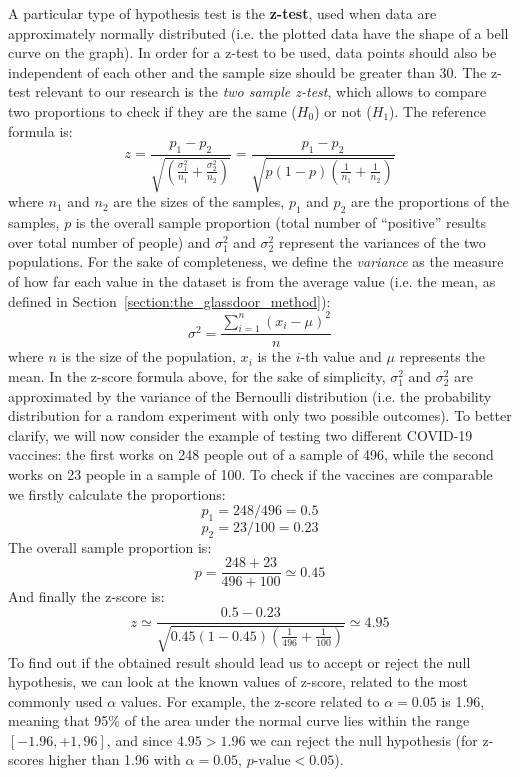 A particular type of hypothesis test is the \textbf{z-test}, used when data are approximately normally distributed (i.e. the plotted data have the shape of a bell curve on the graph). In order for a z-test to be used, data points should also be independent of each other and the sample size should be greater than 30. The z-test relevant to our research is the \textit{two sample z-test}, which allows to compare two proportions to check if they are the same (\(H_0\)) or not (\(H_1\)). The reference formula is: \[z = \frac{p_1 - p_2}{\sqrt{(\frac{\sigma_1^2}{n_1} + \frac{\sigma_2^2}{n_2})}} = \frac{p_1 - p_2}{\sqrt{p(1 - p)(\frac{1}{n_1} + \frac{1}{n_2})}}\] where \(n_1\) and \(n_2\) are the sizes of the samples, \(p_1\) and \(p_2\) are the proportions of the samples, \(p\) is the overall sample proportion (total number of ``positive'' results over total number of people) and \(\sigma_1^2\) and \(\sigma_2^2\) represent the variances of the two populations. For the sake of completeness, we define the \textit{variance} as the measure of how far each value in the dataset is from the average value (i.e. the mean, as defined in Section~\ref{section:the_glassdoor_method}): \[\sigma^2 = \frac{\sum\limits_{i=1}^n (x_i - \mu)^2}{n}\] where \(n\) is the size of the population, \(x_i\) is the \(i\)-th value and \(\mu\) represents the mean. In the z-score formula above, for the sake of simplicity, \(\sigma_1^2\) and \(\sigma_2^2\) are approximated by the variance of the Bernoulli distribution (i.e. the probability distribution for a random experiment with only two possible outcomes). To better clarify, we will now consider the example of testing two different COVID-19 vaccines: the first works on 248 people out of a sample of 496, while the second works on 23 people in a sample of 100. To check if the vaccines are comparable we firstly calculate the proportions: \[p_1 = 248 / 496 = 0.5\] \[p_2 = 23 / 100 = 0.23\]
The overall sample proportion is: \[p = \frac{248 + 23}{496 + 100} \simeq 0.45\]
And finally the z-score is: \[z \simeq \frac{0.5 - 0.23}{\sqrt{0.45(1 - 0.45)(\frac{1}{496} + \frac{1}{100})}} \simeq 4.95\]
To find out if the obtained result should lead us to accept or reject the null hypothesis, we can look at the known values of z-score, related to the most commonly used \(\alpha\) values. For example, the z-score related to \(\alpha = 0.05\) is 1.96, meaning that 95\% of the area under the normal curve lies within the range \([-1.96, +1,96]\), and since \(4.95 > 1.96\) we can reject the null hypothesis (for z-scores higher than 1.96 with \(\alpha = 0.05\), \(p\textrm{-value} < 0.05\)).
